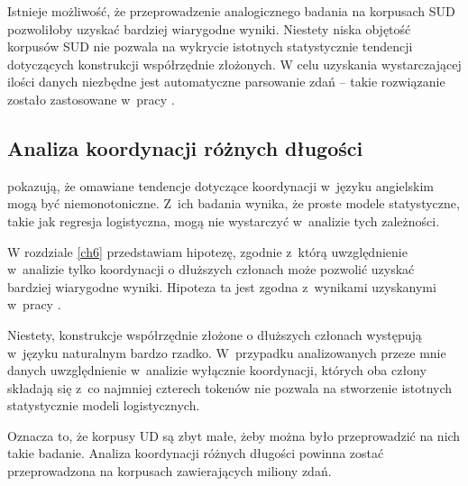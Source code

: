 Istnieje możliwość, że przeprowadzenie analogicznego badania na korpusach SUD pozwoliłoby uzyskać bardziej wiarygodne wyniki. Niestety niska objętość korpusów SUD nie pozwala na wykrycie istotnych statystycznie tendencji dotyczących konstrukcji współrzędnie złożonych. W celu uzyskania wystarczającej ilości danych niezbędne jest automatyczne parsowanie zdań -- takie rozwiązanie zostało zastosowane w~pracy \cite{borysiak2024dependency}.


\subsection{Analiza koordynacji różnych długości}

\cite{przepiorkowski2024argument} pokazują, że omawiane tendencje dotyczące koordynacji w~języku angielskim mogą być niemonotoniczne. Z~ich badania wynika, że proste modele statystyczne, takie jak regresja logistyczna, mogą nie wystarczyć w~analizie tych zależności.

W rozdziale \ref{ch6} przedstawiam hipotezę, zgodnie z~którą uwzględnienie w~analizie tylko koordynacji o dłuższych członach może pozwolić uzyskać bardziej wiarygodne wyniki. Hipoteza ta jest zgodna z~wynikami uzyskanymi w~pracy \cite{przepiorkowski2024argument}. 

Niestety, konstrukcje współrzędnie złożone o dłuższych członach występują w~języku naturalnym bardzo rzadko. W~przypadku analizowanych przeze mnie danych uwzględnienie w~analizie wyłącznie koordynacji, których oba człony składają się z~co najmniej czterech tokenów nie pozwala na stworzenie istotnych statystycznie modeli logistycznych.

Oznacza to, że korpusy UD są zbyt małe, żeby można było przeprowadzić na nich takie badanie. Analiza koordynacji różnych długości powinna zostać przeprowadzona na korpusach zawierających miliony zdań.